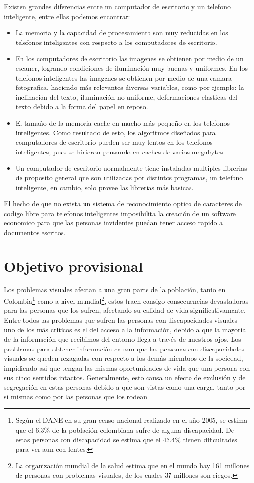 \documentclass[a4paper, 11pt, oneside]{article}
\begin{document}
	Existen grandes diferencias entre un computador de escritorio y un telefono inteligente, entre ellas podemos encontrar:
	\begin{itemize}
   \item La memoria y la capacidad de procesamiento son muy reducidas en los telefonos inteligentes con respecto a los computadores de escritorio.
   \item En los computadores de escritorio las imagenes se obtienen por medio de un escaner, logrando condiciones de iluminación muy buenas y uniformes. En los telefonos inteligentes las imagenes se obtienen por medio de una camara fotografica, haciendo más relevantes diversas variables, como por ejemplo: la inclinación del texto, iluminación no uniforme, deformaciones elasticas del texto debido a la forma del papel en reposo.
   \item El tamaño de la memoria cache en mucho más pequeño en los telefonos inteligentes. Como resultado de esto, los algoritmos diseñados para computadores de escritorio pueden ser muy lentos en los telefonos inteligentes, pues se hicieron pensando en caches de varios megabytes.
	\item Un computador de escritorio normalmente tiene instaladas multiples librerias de proposito general que son utilizadas por distintos programas, un telefono inteligente, en cambio, solo provee las librerias más basicas.
	\end{itemize}

	El hecho de que no exista un sistema de reconocimiento optico de caracteres de codigo libre para telefonos inteligentes imposibilita la creación de un software economico para que las personas invidentes puedan tener acceso rapido a documentos escritos.
	\clearpage
	\section{Objetivo provisional}
	Los problemas visuales afectan a una gran parte de la población, tanto en Colombia\footnote{Según el DANE en su gran censo nacional realizado en el año 2005, se estima que el 6.3\% de la población colombiana sufre de alguna discapacidad. De estas personas con discapacidad se estima que el 43.4\% tienen dificultades para ver aun con lentes.} como a nivel mundial\footnote{La organización mundial de la salud estima que en el mundo hay 161 millones de personas con problemas visuales, de los cuales 37 millones son ciegos.}, estos traen consigo consecuencias devastadoras para las personas que los sufren, afectando su calidad de vida significativamente. Entre todos las problemas que sufren las personas con discapacidades visuales uno de los más criticos es el del acceso a la información, debido a que la mayoría de la información que recibimos del entorno llega a través de nuestros ojos. Los problemas para obtener información causan que las personas con discapacidades visuales se queden rezagadas con respecto a los demás miembros de la sociedad, impidiendo asi que tengan las mismas oportunidades de vida que una persona con sus cinco sentidos intactos. Generalmente, esto causa un efecto de exclusión y de segregación en estas personas debido a que son vistas como una carga, tanto por si mismas como por las personas que los rodean. 
\end{document}
